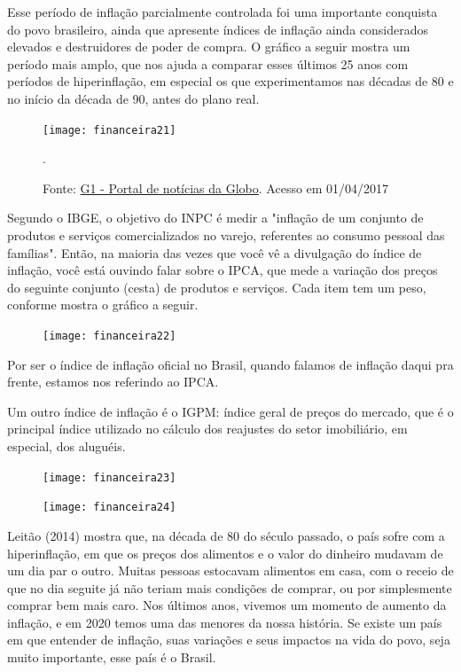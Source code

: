 Esse período de inflação parcialmente controlada foi uma importante conquista do povo brasileiro, ainda que apresente índices de inflação ainda considerados elevados e destruidores de poder de compra. O gráfico a seguir mostra um período mais amplo, que nos ajuda a comparar esses últimos 25 anos com períodos de hiperinflação, em especial os que experimentamos nas décadas de 80 e no início da década de 90, antes do plano real.

\begin{figure}[H]
\centering

\texttt{[image: financeira21]}

\caption{Fonte: \href{http://g1.globo.com/economia/inflacao-o-que-e/platb}{G1 - Portal de notícias da Globo}. Acesso em 01/04/2017}.
\label{}
\end{figure}

Segundo o IBGE, o objetivo do INPC é medir a "inflação de um conjunto de produtos e serviços comercializados no varejo, referentes ao consumo pessoal das famílias". Então, na maioria das vezes que você vê a divulgação do índice de inflação, você está ouvindo falar sobre o IPCA, que mede a variação dos preços do seguinte conjunto (cesta) de produtos e serviços. Cada item tem um peso, conforme mostra o gráfico a seguir.

\begin{figure}[H]
\centering

\texttt{[image: financeira22]}
\end{figure}

Por ser o índice de inflação oficial no Brasil, quando falamos de inflação daqui pra frente, estamos nos referindo ao IPCA.

Um outro índice de inflação é o IGPM: índice geral de preços do mercado, que é o principal índice utilizado no cálculo dos reajustes do setor imobiliário, em especial, dos aluguéis.

\begin{figure}[H]
\centering

\texttt{[image: financeira23]}
\end{figure}

\begin{observation}{}
\begin{figure}
\texttt{[image: financeira24]}
\end{figure}

Leitão (2014) mostra que, na década de 80 do século passado, o país sofre com a hiperinflação, em que os preços dos alimentos e o valor do dinheiro mudavam de um dia par o outro. Muitas pessoas estocavam alimentos em casa, com o receio de que no dia seguite já não teriam mais condições de comprar, ou por simplesmente comprar bem mais caro. Nos últimos anos, vivemos um momento de aumento da inflação, e em 2020 temos uma das menores da nossa história. Se existe um país em que entender de inflação, suas variações e seus impactos na vida do povo, seja muito importante, esse país é o Brasil.
\end{observation}

